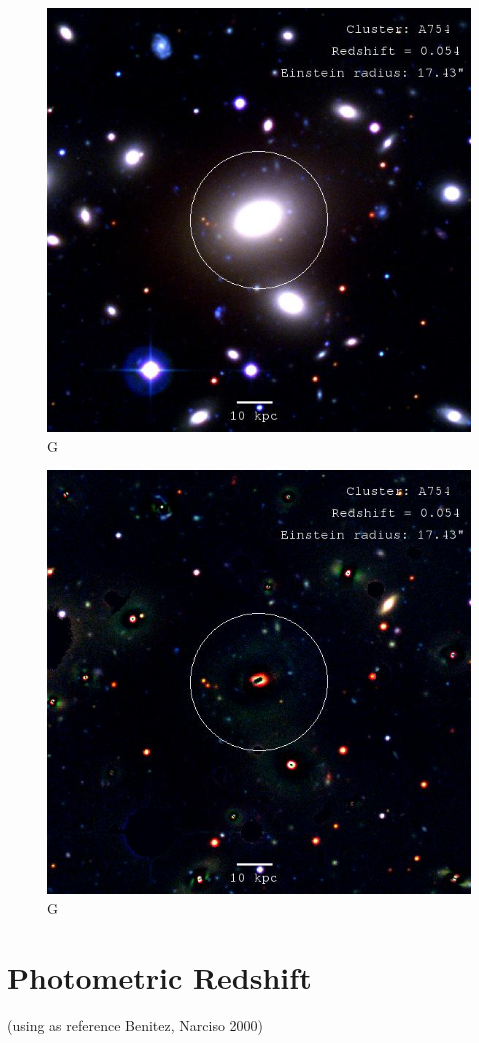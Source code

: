 \begin{figure}[H]
\centering
\includegraphics[width=12cm]{images/cA754.jpg}
\caption[M]{G}
\end{figure}

\begin{figure}[H]
\centering
\includegraphics[width=12cm]{images/cA754_galfit.jpg}
\caption[M]{G}
\end{figure}


\section{Photometric Redshift}

(using as reference Benitez, Narciso 2000)